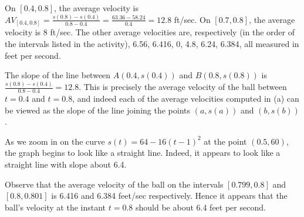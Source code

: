 \begin{activitySolution}
\ba
	\item On $[0.4,0.8]$, the average velocity is $AV_{[0.4,0.8]} = \frac{s(0.8)-s(0.4)}{0.8-0.4} = \frac{63.36-58.24}{0.4} = 12.8$ ft/sec.  On $[0.7,0.8]$, the average velocity is 8 ft/sec.  The other average velocities are, respectively (in the order of the intervals listed in the activity), 6.56, 6.416, 0, 4.8, 6.24, 6.384, all measured in feet per second.
	\item The slope of the line between $A(0.4, s(0.4))$ and $B(0.8, s(0.8))$ is $\frac{s(0.8)-s(0.4)}{0.8-0.4} = 12.8$.  This is precisely the average velocity of the ball between $t = 0.4$ and $t = 0.8$, and indeed each of the average velocities computed in (a) can be viewed as the slope of the line joining the points $(a,s(a))$ and $(b,s(b))$.

	\item As we zoom in on the curve $s(t) = 64 - 16(t-1)^2$ at the point $(0.5, 60)$, the graph begins to look like a straight line.  Indeed, it appears to look like a straight line with slope about 6.4.
	\item Observe that the average velocity of the ball on the intervals $[0.799,0.8]$ and $[0.8,0.801]$ is 6.416 and 6.384 feet/sec respectively.  Hence it appears that the ball's velocity at the instant $t = 0.8$ should be about 6.4 feet per second.
\ea
\end{activitySolution}
\aftera